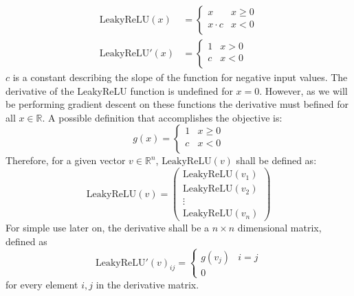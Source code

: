 \documentclass[12pt]{article}
\begin{document}
\begin{align} \label{eq:NN:ReLU}
\text{LeakyReLU}(x)& = \left\{
\begin{array}{ll}
x & x \ge 0 \\
x \cdot c & x < 0 \\
\end{array}
\right.\\\label{eq:NN:Relu_derivative}
\text{LeakyReLU}'(x) &= \left\{
\begin{array}{ll}
1 & x > 0 \\
c & x < 0 \\
\end{array}
\right.
\end{align}
\(c\) is a constant describing the slope of the function for negative input values. The derivative of the LeakyReLU function is undefined for \(x=0\). However, as we will be performing gradient descent on these functions the derivative must befined for all \(x \in \mathbb R\). A possible definition that accomplishes the objective is:
\begin{equation}
g(x) = 
\begin{cases}
1 & x \ge 0\\
c & x < 0\\
\end{cases}
\end{equation}
Therefore, for a given vector \(v \in \mathbb R^n\), \(\text{LeakyReLU}(v)\) shall be defined as:
\begin{equation}\label{eq:vecTanh}
\text{LeakyReLU}(v) = \left(
\begin{matrix}
\text{LeakyReLU}(v_1)\\
\text{LeakyReLU}(v_2)\\
\vdots\\
\text{LeakyReLU}(v_n)
\end{matrix}
\right)
\end{equation}
For simple use later on, the derivative shall be a \(n \times n\) dimensional matrix, defined as
\begin{equation}
\text{LeakyReLU}'(v)_{ij} = \left\{\begin{matrix}
g(v_{j}) & i = j \\
0
\end{matrix}\right.
\end{equation}
for every element \(i,j\) in the derivative matrix.
\end{document}
